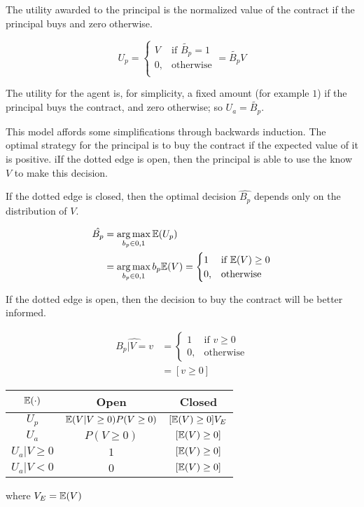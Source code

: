 \documentclass[../thesis.tex]{subfiles}
\begin{document}
The utility awarded to the principal is the normalized
value of the contract if the principal buys and zero
otherwise.

$$U_p = \begin{cases}
               V & \text{if } \tilde{B_p} = 1 \\
               0, & \text{otherwise}\\
\end{cases} = \tilde{B_p} V$$

The utility for the agent is, for simplicity, 
a fixed amount (for example $1$) if the principal buys the contract,
and zero otherwise; so $U_a = \tilde{B_p}$.

This model affords some simplifications through backwards 
induction.
The optimal strategy for the principal is 
to buy the contract if the expected value of it is positive.
iIf the dotted edge is open, then the principal is able to use
the know $V$ to make this decision.

If the dotted edge is closed, then the optimal
decision $\hat{B_p}$ depends only on
the distribution of $V$.

\begin{equation}
  \begin{split}
    \hat{B_p} & = \operatorname*{arg\,max}_{b_p \in {0,1}} \mathbb{E}(U_p) \\
      & = \operatorname*{arg\,max}_{b_p \in {0,1}} b_p \mathbb{E}(V) = \begin{cases}
      1 & \text{if } \mathbb{E}(V) \geq 0 \\
      0, & \text{otherwise}\\
    \end{cases}
  \end{split}
\end{equation}


If the dotted edge is open, then the decision to buy
the contract will be better informed.

\begin{equation}
  \begin{split}
    \hat{B_p \vert V = v} & = \begin{cases}
      1 & \text{if } v \geq 0 \\
      0, & \text{otherwise}
    \end{cases} \\
    & = [v \geq 0]
  \end{split}
\end{equation}

\begin{center}
\begin{tabular}{ |c|c|c| } 
 \hline
  $\mathbb{E}(\cdot)$ & Open & Closed \\
 \hline
 $U_p$ & $\mathbb{E}(V \vert V \geq 0) P(V \geq 0)$ & $[\mathbb{E}(V) \geq 0] V_E$  \\ 
 $U_a$ & $P(V \geq 0)$ & $[\mathbb{E}(V) \geq 0]$  \\
 $U_a \vert V \geq 0$ & $1$ & $[\mathbb{E}(V) \geq 0]$  \\
 $U_a \vert V < 0$ & $0$ & $[\mathbb{E}(V) \geq 0]$  \\
 \hline
\end{tabular}
\end{center}
where $V_E = \mathbb{E}(V)$
\end{document}
